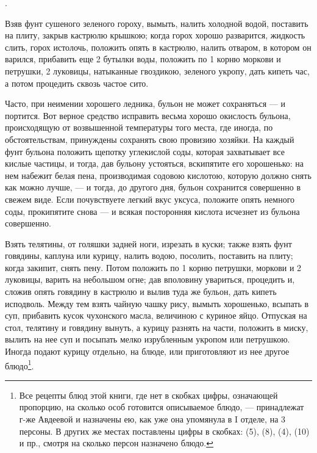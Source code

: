 .

Взяв фунт сушеного зеленого гороху, вымыть, налить холодной водой, поставить на плиту, закрыв кастрюлю крышкою; когда горох хорошо разварится, жидкость слить, горох истолочь, положить опять в кастрюлю, налить отваром, в котором он варился, прибавить еще 2 бутылки воды, положить по 1 корню моркови и петрушки, 2 луковицы, натыканные гвоздикою, зеленого укропу, дать кипеть час, а потом процедить сквозь частое сито.


Часто, при неимении хорошего ледника, бульон не может сохраняться — и портится. Вот верное средство исправить весьма хорошо окислость бульона, происходящую от возвышенной температуры того места, где иногда, по обстоятельствам, принуждены сохранять свою провизию хозяйки. На каждый фунт бульона положить щепотку углекислой соды, которая захватывает все кислые частицы, и тогда, дав бульону устояться, вскипятите его хорошенько: на нем набежит белая пена, производимая содовою кислотою, которую должно снять как можно лучше, — и тогда, до другого дня, бульон сохранится совершенно в свежем виде. Если почувствуете легкий вкус уксуса, положите опять немного соды, прокипятите снова — и всякая посторонняя кислота исчезнет из бульона совершенно.


Взять телятины, от голяшки задней ноги, изрезать в куски; также взять фунт говядины, каплуна или курицу, налить водою, посолить, поставить на плиту; когда закипит, снять пену. Потом положить по 1 корню петрушки, моркови и 2 луковицы, варить на небольшом огне; дав вполовину увариться, процедить и, сложив опять говядину в кастрюлю и вылив туда же бульон, дать кипеть исподволь. Между тем взять чайную чашку рису, вымыть хорошенько, всыпать в суп, прибавить кусок чухонского масла, величиною с куриное яйцо. Отпуская на стол, телятину и говядину вынуть, а курицу разнять на части, положить в миску, вылить на нее суп и посыпать мелко изрубленным укропом или петрушкою. Иногда подают курицу отдельно, на блюде, или приготовляют из нее другое блюдо\footnote{Все рецепты блюд этой книги, где нет в скобках цифры, означающей пропорцию, на сколько особ готовится описываемое блюдо, — принадлежат г-же Авдеевой и назначены ею, как уже она упомянула в I отделе, на 3 персоны. В других же местах поставлены цифры в скобках: (5), (8), (4), (10) и пр., смотря на сколько персон назначено блюдо.}.



